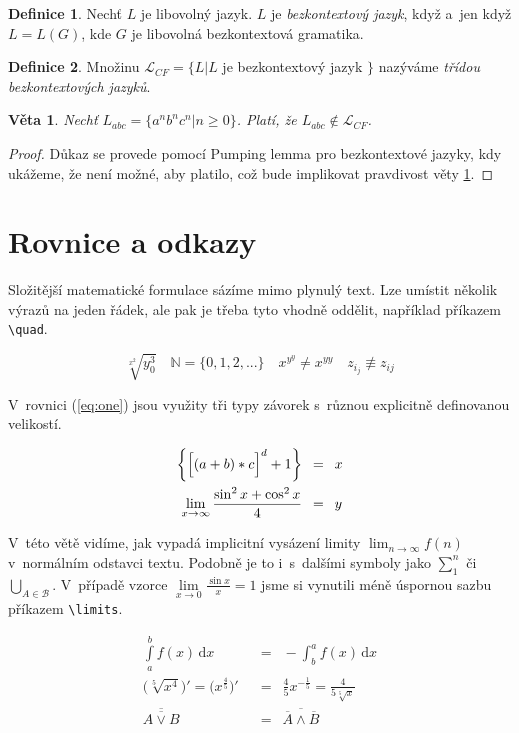 \documentclass[11pt,a4paper,twocolumn,oneside]{article}
\theoremstyle{definition}
\newtheorem{definice}{Definice}[section]
\theoremstyle{plain}
\theoremstyle{plain}
\newtheorem{veta}{Věta}
\begin{document}
	\begin{definice}
Nechť $L$ je libovolný jazyk. $L$ je {\itshape bezkontextový jazyk}, když a~jen když $L=L(G)$, kde $G$ je libovolná bezkontextová gramatika.
	\end{definice}	
	
	\begin{definice}
Množinu $\mathcal{L}_{CF}=\{L|L$ je bezkontextový jazyk $\}$ nazýváme {\itshape třídou bezkontextových jazyků}.
	\end{definice}
	
	\begin{veta} \label{veta_1}
{\itshape Nechť} $L_{abc}=\{a^n b^n c^n|n \geq 0\}$. Platí, že $L_{abc} \notin \mathcal{L}_{CF}$.
	\end{veta}

\begin{proof}
\noindent Důkaz se provede pomocí Pumping lemma pro bezkontextové jazyky, kdy ukážeme, že není možné, aby platilo, což bude implikovat pravdivost věty \ref{veta_1}.
\end{proof}

	\section{Rovnice a odkazy}

Složitější matematické formulace sázíme mimo plynulý text. Lze umístit několik výrazů na jeden řádek, ale pak je třeba tyto vhodně oddělit, například příkazem \verb|\quad|.

$$\sqrt[x^2]{y^3_0} \quad \mathbb{N}=\{0,1,2,...\} \quad x^{y^y} \neq x^{yy} \quad z_{i_j} \not\equiv z_{ij}$$

V~rovnici (\ref{eq:one}) jsou využity tři typy závorek s~různou explicitně definovanou velikostí. \medskip

\begin{align}
\bigg\{\Big[(a+b)*c\Big]^d +1\bigg\} \enspace &= \enspace x \label{eq:one}\\
\lim_{x\to\infty}\frac{\sin^2x+\cos^2x}{4} \enspace &= \enspace y \notag
\end{align}

V~této větě vidíme, jak vypadá implicitní vysázení limity $\lim_{n\to\infty}f(n)$ v~normálním odstavci textu. Podobně je to i~s~dalšími symboly jako $\sum\nolimits _{1}^{n}$ či $\bigcup_{A \in \mathcal{B}}$. V~případě vzorce $\lim\limits_{x \to 0} \frac{\sin x}{x}=1$ jsme si vynutili méně úspornou sazbu příkazem \verb|\limits|. \medskip

\begin{align} 
\int\limits_a^b \! f(x) \, \mathrm{d}x \enspace &= \enspace -\int_b^a \! f(x) \, \mathrm{d}x \label{eq:2}\\
{\Big(\sqrt[5]{x^4}\Big)'}={\Big(x^{\frac{4}{5}}\Big)'} \enspace &= \enspace \frac{4}{5}x^{-\frac{1}{5}}=\frac{4}{5 \sqrt[5]{x}} \label{eq:3}\\
\overline{\overline{A \vee B}} \enspace &= \enspace \overline{\overline{A} \wedge \overline{B}} \label{eq:4}
\end{align}
\end{document}
